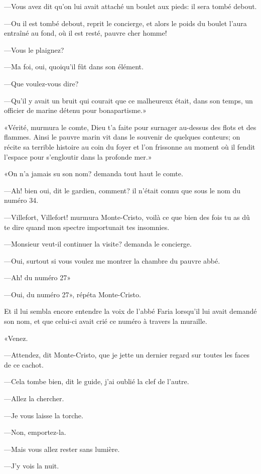 —Vous avez dit qu'on lui avait attaché un boulet aux pieds: il sera tombé debout. 

—Ou il est tombé debout, reprit le concierge, et alors le poids du boulet l'aura entraîné au fond, où il est resté, pauvre cher homme! 

—Vous le plaignez? 

—Ma foi, oui, quoiqu'il fût dans son élément. 

—Que voulez-vous dire? 

—Qu'il y avait un bruit qui courait que ce malheureux était, dans son temps, un officier de marine détenu pour bonapartisme.» 

«Vérité, murmura le comte, Dieu t'a faite pour surnager au-dessus des flots et des flammes. Ainsi le pauvre marin vit dans le souvenir de quelques conteurs; on récite sa terrible histoire au coin du foyer et l'on frissonne au moment où il fendit l'espace pour s'engloutir dans la profonde mer.» 

«On n'a jamais su son nom? demanda tout haut le comte. 

—Ah! bien oui, dit le gardien, comment? il n'était connu que sous le nom du numéro 34. 

—Villefort, Villefort! murmura Monte-Cristo, voilà ce que bien des fois tu as dû te dire quand mon spectre importunait tes insomnies. 

—Monsieur veut-il continuer la visite? demanda le concierge. 

—Oui, surtout si vous voulez me montrer la chambre du pauvre abbé. 

—Ah! du numéro 27» 

—Oui, du numéro 27», répéta Monte-Cristo. 

Et il lui sembla encore entendre la voix de l'abbé Faria lorsqu'il lui avait demandé son nom, et que celui-ci avait crié ce numéro à travers la muraille. 

«Venez. 

—Attendez, dit Monte-Cristo, que je jette un dernier regard sur toutes les faces de ce cachot. 

—Cela tombe bien, dit le guide, j'ai oublié la clef de l'autre. 

—Allez la chercher. 

—Je vous laisse la torche. 

—Non, emportez-la. 

—Mais vous allez rester sans lumière. 

—J'y vois la nuit. 


